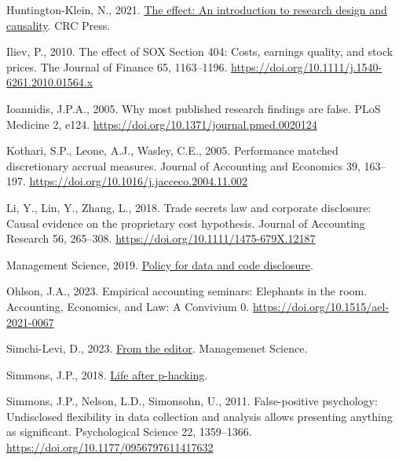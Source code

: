 \documentclass[
  letterpaper,
  DIV=11,
  numbers=noendperiod]{scrartcl}
\newlength{\cslhangindent}
\newlength{\cslentryspacingunit} %
\newenvironment{CSLReferences}[2] %
 {%
  \setlength{\parindent}{0pt}
  \ifodd #1
  \let\oldpar\par
  \def\par{\hangindent=\cslhangindent\oldpar}
  \fi
  \setlength{\parskip}{#2\cslentryspacingunit}
 }%
 {}
\begin{document}
\begin{CSLReferences}{1}{0}
\leavevmode{}%
Huntington-Klein, N., 2021.
\href{https://books.google.com/books?id=f0NOEAAAQBAJ}{The effect: An
introduction to research design and causality}. CRC Press.

\leavevmode{}%
Iliev, P., 2010. The effect of {SOX Section} 404: Costs, earnings
quality, and stock prices. The Journal of Finance 65, 1163--1196.
\url{https://doi.org/10.1111/j.1540-6261.2010.01564.x}

\leavevmode{}%
Ioannidis, J.P.A., 2005. Why most published research findings are false.
{PLoS} Medicine 2, e124.
\url{https://doi.org/10.1371/journal.pmed.0020124}

\leavevmode{}%
Kothari, S.P., Leone, A.J., Wasley, C.E., 2005. Performance matched
discretionary accrual measures. Journal of Accounting and Economics 39,
163--197. \url{https://doi.org/10.1016/j.jacceco.2004.11.002}

\leavevmode{}%
Li, Y., Lin, Y., Zhang, L., 2018. Trade secrets law and corporate
disclosure: Causal evidence on the proprietary cost hypothesis. Journal
of Accounting Research 56, 265--308.
\url{https://doi.org/10.1111/1475-679X.12187}

\leavevmode{}%
Management Science, 2019.
\href{https://pubsonline.informs.org/page/mnsc/datapolicy}{Policy for
data and code disclosure}.

\leavevmode{}%
Ohlson, J.A., 2023. Empirical accounting seminars: Elephants in the
room. Accounting, Economics, and Law: A Convivium 0.
\url{https://doi.org/10.1515/ael-2021-0067}

\leavevmode{}%
Simchi-Levi, D., 2023.
\href{https://www.informs.org/Blogs/ManSci-Blogs/From-the-Editor}{From
the editor}. Managemenet Science.

\leavevmode{}%
Simmons, J.P., 2018.
\href{https://www.youtube.com/watch?v=8wDwcp1EwNM}{Life after
p-hacking}.

\leavevmode{}%
Simmons, J.P., Nelson, L.D., Simonsohn, U., 2011. False-positive
psychology: Undisclosed flexibility in data collection and analysis
allows presenting anything as significant. Psychological Science 22,
1359--1366. \url{https://doi.org/10.1177/0956797611417632}


\end{CSLReferences}
\end{document}

